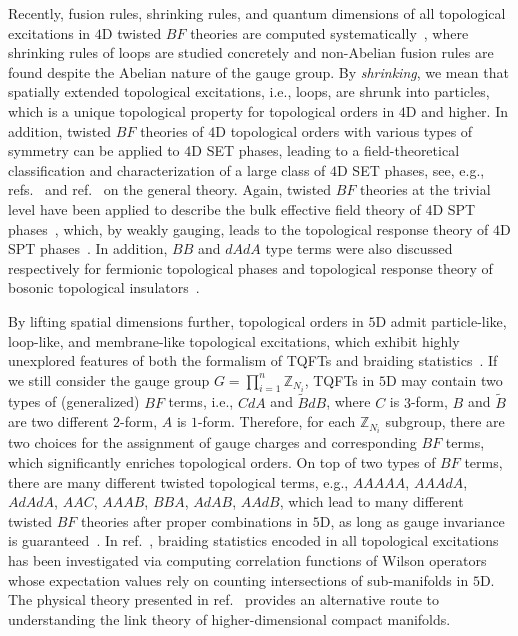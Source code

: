 \documentclass[11pt,nofootinbib,preprint]{revtex4-1}
\def\Z{\mathbb{Z}}
\begin{document}
   Recently, fusion rules, shrinking rules, and quantum dimensions of all topological excitations in $4$D  twisted $BF$ theories are computed systematically~\cite{PhysRevB.107.165117}, where shrinking rules of loops are studied concretely and  non-Abelian fusion rules are found despite the Abelian nature of the gauge group.   By \textit{shrinking}, we mean that spatially extended topological excitations, i.e., loops, are shrunk into particles, which is a unique topological property for topological orders in $4$D and higher.  
   In addition, twisted $BF$ theories  of $4$D topological orders with various types of  symmetry can be applied to $4$D SET phases, leading to a field-theoretical classification and characterization of a large class of $4$D SET phases, see, e.g., refs.~\cite{ye16_set,2016arXiv161008645Y,Ye:2017aa,ye16a} and ref.~\cite{Ning2018prb} on the general theory. Again, twisted $BF$ theories at the trivial level have been applied to describe the bulk effective field theory of $4$D SPT phases~\cite{YeGu2015,bti2}, which, by weakly gauging, leads to the topological response theory of $4$D SPT phases~\cite{PhysRevLett.114.031601,PhysRevB.99.205120,bti6}. In addition, $BB$ and $dAdA$ type terms were also discussed respectively for fermionic topological phases and topological response theory of bosonic topological insulators~\cite{Kapustin:2014gua,PhysRevB.99.235137,zhang2023continuum,bti2,YW13a,lapa17}.
   
   
   By lifting spatial dimensions further, topological orders in $5$D admit particle-like, loop-like, and membrane-like topological excitations, which exhibit highly unexplored features of both the formalism of TQFTs and braiding statistics~\cite{Zhang:2021ycl}.   If we still consider the gauge group $G=\prod_{i=1}^n\Z_{N_i}$,  TQFTs in $5$D may contain two types of (generalized) $BF$ terms, i.e., $CdA$ and $\tilde{B}dB$, where $C$ is $3$-form, $B$ and $\tilde{B}$ are two different $2$-form, $A$ is $1$-form.  Therefore, for each $\Z_{N_i}$ subgroup, there are two choices for the assignment of gauge charges and corresponding $BF$ terms, which significantly enriches topological orders. On top of two types of $BF$ terms, there are many different twisted topological terms, e.g., $AAAAA$, $AAAdA$, $AdAdA$, $AAC$, $AAAB$, $BBA$, $AdAB$, $AAdB$, which lead to many different twisted $BF$ theories after proper combinations in $5$D,  as long as gauge invariance is guaranteed~\cite{zhang2021compatible}.  In ref.~\cite{Zhang:2021ycl}, braiding statistics encoded in all topological excitations has been investigated  via computing correlation functions of Wilson operators whose   expectation values  rely on  counting intersections of sub-manifolds in $5$D. The physical theory presented in ref.~\cite{Zhang:2021ycl}  provides an alternative route to understanding the link theory of higher-dimensional compact manifolds.  
\end{document}
